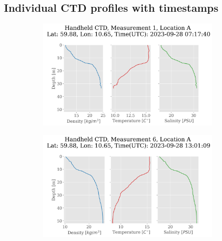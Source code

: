 \documentclass[a4paper,10pt,english]{article}
\begin{document}
\subsection{Individual CTD profiles with timestamps}\label{app:CTD}
\begin{figure}[H]
    \begin{adjustwidth}{-2.5cm}{-2.5cm}  %
    \begin{subfigure}{0.65\textwidth}
            \centering
            \includegraphics[width=1.\linewidth]{../figures/handheld_ctd/handhedld_ctd_Measurement_1_Location_A.png}
            \caption{}
            \label{fig:handheld_m1lA}
    \end{subfigure}%
    \begin{subfigure}{0.65\textwidth}
            \centering
            \includegraphics[width=1.\linewidth]{../figures/handheld_ctd/handhedld_ctd_Measurement_6_Location_A.png}
            \caption{}
            \label{fig:handheld_m6lA}
    \end{subfigure}
    

\end{adjustwidth}
\end{figure}
\end{document}
